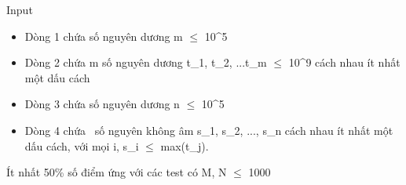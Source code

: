 Input
\begin{itemize}
	\item     Dòng 1 chứa số nguyên dương m  $\le$  10^5   
	\item     Dòng 2 chứa m số nguyên dương t\_1, t\_2, ...t\_m  $\le$  10^9 cách nhau ít nhất một dấu cách   
	\item     Dòng 3 chứa số nguyên dương n  $\le$  10^5   
	\item     Dòng 4 chứa     số nguyên không âm s\_1, s\_2, ..., s\_n cách nhau ít nhất một dấu cách, với mọi i, s\_i  $\le$  max(t\_j).   
\end{itemize}

Ít nhất 50\% số điểm ứng với các test có M, N  $\le$  1000